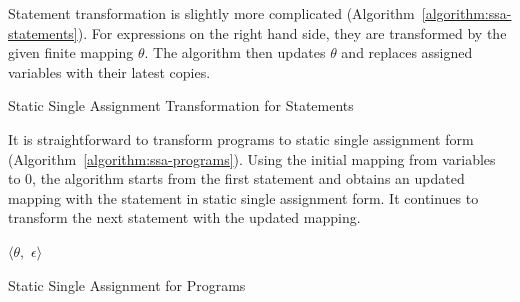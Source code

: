 Statement transformation is slightly more complicated
(Algorithm~\ref{algorithm:ssa-statements}). For 
expressions on the right hand side, they are transformed by the given
finite mapping $\theta$. The algorithm then updates $\theta$ and
replaces assigned variables with their latest copies. 

\begin{algorithm}
  \begin{algorithmic}[1]
      \EndCase
      \EndCase
    \EndMatch
    \EndFunction
  \end{algorithmic}
  \caption{Static Single Assignment Transformation for Statements}
  \label{algorithm:ssa-statements}
\end{algorithm}

It is straightforward to transform programs to static single
assignment form (Algorithm~\ref{algorithm:ssa-programs}). Using the
initial mapping from variables to $0$, 
the algorithm starts from the first statement and obtains an
updated mapping with the statement in static single assignment form. It
continues to transform the next statement with the updated mapping. 

\begin{algorithm}
  \begin{algorithmic}[1]
      \Case{$\epsilon$}
        \Return $\langle \theta,$ $\epsilon \rangle$
      \EndCase
      \EndCase
    \EndMatch
    \EndFunction
  \end{algorithmic}
  \caption{Static Single Assignment for Programs}
  \label{algorithm:ssa-programs}
\end{algorithm}

